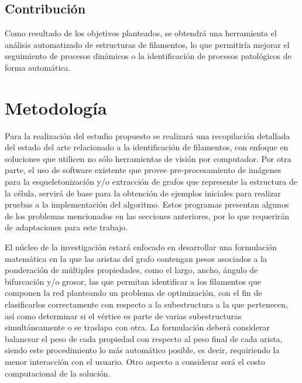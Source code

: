 \documentclass{article}
\begin{document}
\subsection{Contribuci\'on}

Como resultado de los objetivos planteados, se obtendr\'a una herramienta el an\'alisis automatizado de estructuras de filamentos, lo que permitir\'ia mejorar el seguimiento de procesos din\'amicos o la identificaci\'on de procesos patol\'ogicos de forma autom\'atica.

\section{Metodolog\'ia}

Para la realizaci\'on del estudio propuesto se realizar\'a una recopilaci\'on detallada del estado del arte relacionado a la identificaci\'on de filamentos, con enfoque en soluciones que utilicen no s\'olo herramientas de visi\'on por computador.
Por otra parte, el uso de software existente que provee pre-procesamiento de im\'agenes para la esqueletonizaci\'on y/o extracción de grafos que represente la estructura de la c\'elula, servir\'a de base para la obtenci\'on de ejemplos iniciales para realizar pruebas a la implementaci\'on del algoritmo. Estos programas presentan algunos de los problemas mencionados en las secciones anteriores, por lo que requerir\'an de adaptaciones para este trabajo.  


El n\'ucleo de la investigaci\'on estar\'a enfocado en desarrollar una formulaci\'on matem\'atica en la que las aristas del grafo contengan pesos asociados a la ponderaci\'on de m\'ultiples propiedades, como el largo, ancho, \'angulo de bifurcación y/o grosor, las que permitan identificar a los filamentos que componen la red planteando un problema de optimizaci\'on, con el fin de clasificarlos correctamente con respecto a la subestructura a la que pertenecen, as\'i como determinar si el v\'ertice es parte de varias subestructuras simult\'aneamente o se traslapa con otra.
La formulaci\'on deber\'a considerar balancear el peso de cada propiedad con respecto al peso final de cada arista, siendo este procedimiento lo m\'as autom\'atico posible, es decir, requiriendo la menor interacci\'on con el usuario. Otro aspecto a considerar ser\'a el costo computacional de la soluci\'on.
\end{document}
